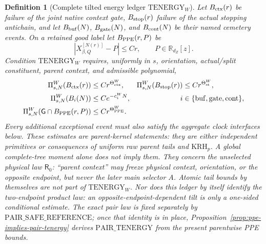 \documentclass[11pt]{article}
\newtheorem{definition}[theorem]{Definition}
\begin{document}
\begin{definition}[Complete tilted energy ledger
$\mathrm{TENERGY}_{W}$]
\label{def:tilted-energy-ledger}
Let $B_{\rm ctx}(r)$ be failure of the joint native context gate,
$B_{\rm stop}(r)$ failure of the actual stopping antichain, and let
$B_{\rm buf}(N)$, $B_{\rm gate}(N)$, and $B_{\rm cont}(N)$ be their named
cemetery events.  On a retained good label let $B_{\rm PPE}(r,P)$ be
\[
 |X^{[N(r)]}_{\beta,Q}-P|\le Cr,
 \qquad P\in\mathbb R_{d_Z}[z].
\]
Condition $\mathrm{TENERGY}_{W}$ requires, uniformly in $s$, orientation,
actual/split constituent, parent context, and admissible polynomial,
\begin{align}
 \Pi_{s,N}^{W}(B_{\rm ctx}(r))&\le Cr^{\Theta_{\rm ctx}^{W}},&
 \Pi_{s,N}^{W}(B_{\rm stop}(r))&\le Cr^{\Theta_{\rm st}^{W}},
 \label{eq:tilted-context-stop-tails}\\
 \Pi_{s,N}^{W}(B_i(N))&\le Ce^{-c_i^{W}N},
 &i&\in\{\mathrm{buf},\mathrm{gate},\mathrm{cont}\},
 \label{eq:tilted-auxiliary-tails}\\
 \Pi_{s,N}^{W}(\mathsf G\cap B_{\rm PPE}(r,P))&\le
 Cr^{\Theta_{\rm PPE}^{W}}.
 \label{eq:tilted-PPE-tail}
\end{align}
Every additional exceptional event must also satisfy the aggregate clock
interfaces below.  These estimates are parent-kernel statements: they are
either independent primitives or consequences of uniform raw parent tails
and $\mathrm{KRH}_{p}$.  A global complete-tree moment alone does not imply
them.  They concern the unselected physical law $\mathsf R_0$: ``parent
context'' may freeze physical context, orientation, or the opposite
endpoint, but never the later main selector $A$.  Atomic tail bounds by
themselves are not part of $\mathrm{TENERGY}_{W}$.  Nor does this ledger by
itself identify the two-endpoint product law: an opposite-endpoint-dependent
tilt is only a one-sided conditional estimate.  The exact pair law is fixed
separately by $\mathrm{PAIR\_SAFE\_REFERENCE}$; once that identity is in
place, Proposition~\ref{prop:ppe-implies-pair-tenergy} derives
$\mathrm{PAIR\_TENERGY}$ from the present parentwise PPE bounds.
\end{definition}
\end{document}

